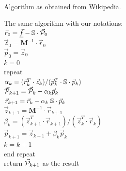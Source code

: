 \begin{minipage}{0.40\textwidth}
\centering
{\captionfont Algorithm as obtained from Wikipedia.}\\
\end{minipage}\hfill
\begin{minipage}{0.50\textwidth}
The same algorithm with our notations:\\
$\vec{r}_0 = \underline{\vec{f}} - {\mathbb{S}} \cdot \vec{\cal P}_0$\\
$\vec{z}_0= {\bm M}^{-1} \cdot \vec{r}_0$ \\
$\vec{p}_0 = \vec{z}_0$\\
$k=0$ \\
repeat\\
\hspace{8mm} $\alpha_k = (\vec{r}_k^T\cdot \vec{z}_k )/(\vec{p}_k^T \cdot {\mathbb{S}}\cdot  \vec{p}_k )$\\
\hspace{8mm} $\vec{\cal P}_{k+1} = \vec{\cal P}_k+\alpha_k \vec{p}_k$\\
\hspace{8mm} $\vec{r}_{k+1} = \vec{r}_k - \alpha_k \; {\mathbb{S}} \cdot \vec{p}_k $ \\
\hspace{8mm} $\vec{z}_{k+1} = {\bm M}^{-1} \cdot \vec{r}_{k+1}$ \\
\hspace{8mm} $\beta_k=(\vec{z}_{k+1}^T \cdot \vec{r}_{k+1})/(\vec{z}_k^T \cdot \vec{r}_k)$ \\
\hspace{8mm} $\vec{p}_{k+1} =\vec{z}_{k+1}+ \beta_k \vec{p}_k$ \\
$k=k+1$ \\
end repeat\\
return $\vec{\cal P}_{k+1}$ as the result
\end{minipage}

